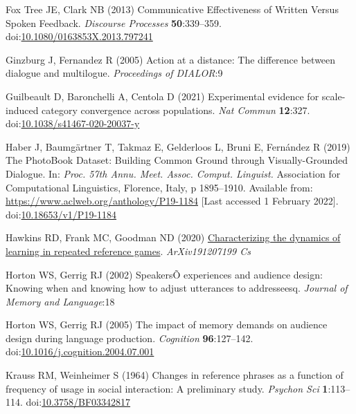 \documentclass[
  english,
  a4paper,
]{article}
\newlength{\cslhangindent}
\newlength{\cslentryspacingunit} %
\newenvironment{CSLReferences}[2] %
 {%
  \setlength{\parindent}{0pt}
  \ifodd #1
  \let\oldpar\par
  \def\par{\hangindent=\cslhangindent\oldpar}
  \fi
  \setlength{\parskip}{#2\cslentryspacingunit}
 }%
 {}
\begin{document}
\begin{CSLReferences}{1}{0}
\leavevmode{}%
Fox Tree JE, Clark NB (2013) Communicative {Effectiveness} of {Written Versus Spoken Feedback}. \emph{Discourse Processes} \textbf{50}:339--359. doi:\href{https://doi.org/10.1080/0163853X.2013.797241}{10.1080/0163853X.2013.797241}

\leavevmode{}%
Ginzburg J, Fernandez R (2005) Action at a distance: The difference between dialogue and multilogue. \emph{Proceedings of DIALOR}:9

\leavevmode{}%
Guilbeault D, Baronchelli A, Centola D (2021) Experimental evidence for scale-induced category convergence across populations. \emph{Nat Commun} \textbf{12}:327. doi:\href{https://doi.org/10.1038/s41467-020-20037-y}{10.1038/s41467-020-20037-y}

\leavevmode{}%
Haber J, Baumgärtner T, Takmaz E, Gelderloos L, Bruni E, Fernández R (2019) The {PhotoBook Dataset}: {Building Common Ground} through {Visually-Grounded Dialogue}. In: \emph{Proc. 57th {Annu}. {Meet}. {Assoc}. {Comput}. {Linguist}.} {Association for Computational Linguistics}, {Florence, Italy}, p 1895--1910. Available from: \url{https://www.aclweb.org/anthology/P19-1184} {[}Last accessed 1 February 2022{]}. doi:\href{https://doi.org/10.18653/v1/P19-1184}{10.18653/v1/P19-1184}

\leavevmode{}%
Hawkins RD, Frank MC, Goodman ND (2020) \href{http://arxiv.org/abs/1912.07199}{Characterizing the dynamics of learning in repeated reference games}. \emph{ArXiv191207199 Cs}

\leavevmode{}%
Horton WS, Gerrig RJ (2002) {SpeakersÕ} experiences and audience design: Knowing when and knowing how to adjust utterances to addresseesq. \emph{Journal of Memory and Language}:18

\leavevmode{}%
Horton WS, Gerrig RJ (2005) The impact of memory demands on audience design during language production. \emph{Cognition} \textbf{96}:127--142. doi:\href{https://doi.org/10.1016/j.cognition.2004.07.001}{10.1016/j.cognition.2004.07.001}

\leavevmode{}%
Krauss RM, Weinheimer S (1964) Changes in reference phrases as a function of frequency of usage in social interaction: A preliminary study. \emph{Psychon Sci} \textbf{1}:113--114. doi:\href{https://doi.org/10.3758/BF03342817}{10.3758/BF03342817}


\end{CSLReferences}
\end{document}
